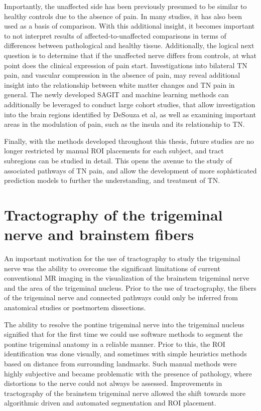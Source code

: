 Importantly, the unaffected side has been previously presumed to be similar to healthy controls due to the absence of pain. In many studies, it has also been used as a basis of comparison. With this additional insight, it becomes important to not interpret results of affected-to-unaffected comparisons in terms of differences between pathological and healthy tissue. Additionally, the logical next question is to determine that if the unaffected nerve differs from controls, at what point does the clinical expression of pain start. Investigations into bilateral TN pain, and vascular compression in the absence of pain, may reveal additional insight into the relationship between white matter changes and TN pain in general. The newly developed SAGIT and machine learning methods can additionally be leveraged to conduct large cohort studies, that allow investigation into the brain regions identified by DeSouza et al, as well as examining important areas in the modulation of pain, such as the insula and its relationship to TN. 

Finally, with the methods developed throughout this thesis, future studies are no longer restricted by manual ROI placements for each subject, and tract subregions can be studied in detail. This opens the avenue to the study of associated pathways of TN pain, and allow the development of more sophisticated prediction models to further the understanding, and treatment of TN. 

\section{Tractography of the trigeminal nerve and brainstem fibers}

An important motivation for the use of tractography to study the trigeminal nerve was the ability to overcome the significant limitations of current conventional MR imaging in the visualization of the brainstem trigeminal nerve and the area of the trigeminal nucleus. Prior to the use of tractography, the fibers of the trigeminal nerve and connected pathways could only be inferred from anatomical studies or postmortem dissections. 

The ability to resolve the pontine trigeminal nerve into the trigeminal nucleus signified that for the first time we could use software methods to segment the pontine trigeminal anatomy in a reliable manner. Prior to this, the ROI identification was done visually, and sometimes with simple heuristics methods based on distance from surrounding landmarks. Such manual methods were highly subjective and became problematic with the presence of pathology, where distortions to the nerve could not always be assessed. Improvements in tractography of the brainstem trigeminal nerve allowed the shift towards more algorithmic driven and automated segmentation and ROI placement.

